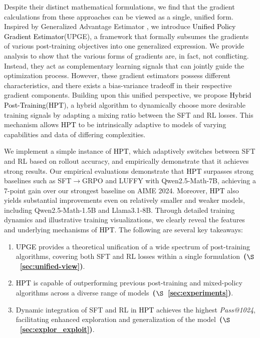 \documentclass{article} %
\newcommand{\0}{\mathbb{0}}
\newcommand{\1}{\mathbb{1}}
\newcommand{\method}{\textcolor{black}{Hybrid Post-Training}\xspace}
\newcommand{\framework}{\textcolor{black}{Unified Policy Gradient Estimator}\xspace}
\newcommand{\mot}{\textcolor{black}{HPT}\xspace}
\newcommand{\gpe}{\textcolor{black}{UPGE}\xspace}
\begin{document}
Despite their distinct mathematical formulations, we find that the gradient calculations from these approaches can be viewed as a single, unified form. Inspired by Generalized Advantage Estimator \citep{schulman2015high}, we introduce \framework (UPGE), a framework that formally subsumes the gradients of various post-training objectives into one generalized expression. We provide analysis to show that the various forms of gradients are, in fact, not conflicting.
Instead, they act as complementary learning signals that can jointly guide the optimization process.
However, these gradient estimators possess different characteristics, and there exists a bias-variance tradeoff in their respective gradient components. 
Building upon this unified perspective, we propose \method (\mot), a hybrid algorithm to dynamically choose more desirable training signals by adapting a mixing ratio between the SFT and RL losses.
This mechanism allows \mot to be intrinsically adaptive to models of varying capabilities and data of differing complexities.

We implement a simple instance of \mot, which adaptively switches between SFT and RL based on rollout accuracy, and empirically demonstrate that it achieves strong results.
Our empirical evaluations demonstrate that \mot surpasses strong baselines such as SFT$\rightarrow$GRPO and LUFFY with Qwen2.5-Math-7B, achieving a 7-point gain over our strongest baseline on AIME 2024.
Moreover, \mot also yields substantial improvements even on relatively smaller and weaker models, including Qwen2.5-Math-1.5B and Llama3.1-8B.
Through detailed training dynamics and illustrative training visualizations, we clearly reveal the features and underlying mechanisms of \mot.
The following are several key takeaways:


\begin{tcolorbox}[takeawaysbox]
\begin{enumerate}[leftmargin=1em]
    \item \gpe provides a theoretical unification of a wide spectrum of post-training algorithms, covering both SFT and RL losses within a single formulation~\textbf{($\S$~\ref{sec:unified-view})}.
    \item \mot is capable of outperforming previous post-training and mixed-policy algorithms across a diverse range of models~\textbf{($\S$~\ref{sec:experiments})}.
    \item Dynamic integration of SFT and RL in \mot achieves the highest \emph{Pass@1024}, facilitating enhanced exploration and generalization of the model~\textbf{($\S$~\ref{sec:explor_exploit})}.
\end{enumerate}



\end{tcolorbox}
\end{document}
